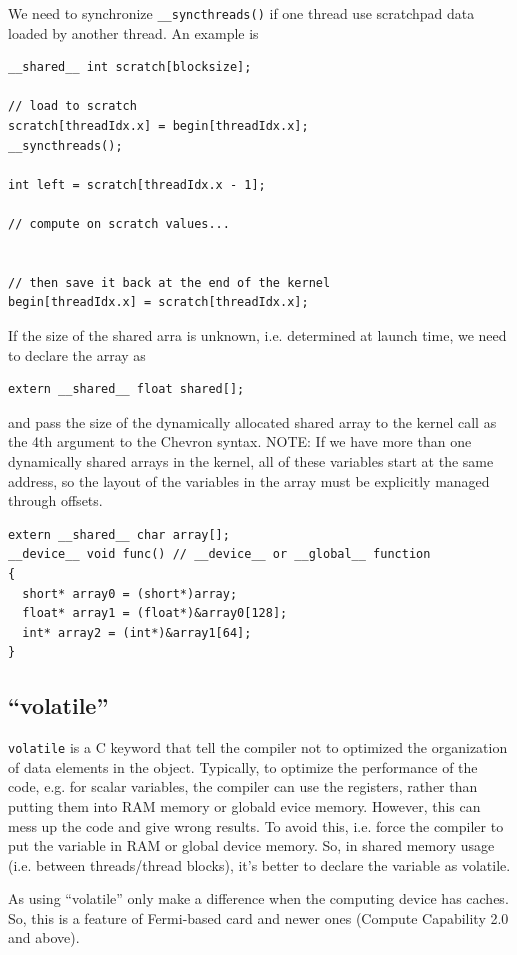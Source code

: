 We need to synchronize \verb!__syncthreads()! if one thread use scratchpad data
loaded by another thread. An example is
\begin{lstlisting}
__shared__ int scratch[blocksize];

// load to scratch
scratch[threadIdx.x] = begin[threadIdx.x];
__syncthreads();

int left = scratch[threadIdx.x - 1];

// compute on scratch values...


// then save it back at the end of the kernel
begin[threadIdx.x] = scratch[threadIdx.x];
\end{lstlisting}

If the size of the shared arra is unknown, i.e. determined at launch time, we
need to declare the array as
\begin{lstlisting}
extern __shared__ float shared[];
\end{lstlisting}
and pass the size of the dynamically allocated shared array to the kernel call
as the 4th argument to the Chevron syntax. NOTE: If we have more than one
dynamically shared arrays in the kernel, all of these variables start at the
same address, so the layout of the variables in the array must be explicitly
managed through offsets.
\begin{lstlisting}
extern __shared__ char array[];
__device__ void func() // __device__ or __global__ function
{
  short* array0 = (short*)array;
  float* array1 = (float*)&array0[128];
  int* array2 = (int*)&array1[64];
}
\end{lstlisting}


\subsection{``volatile''}
\label{sec:volatile}

\verb!volatile! is a C keyword that tell the compiler not to optimized the
organization of data elements in the object. Typically, to optimize the
performance of the code, e.g. for scalar variables, the compiler can use the
registers, rather than putting them into RAM memory or globald evice memory. 
However, this can mess up the code and give wrong results. To avoid this, i.e.
force the compiler to put the variable in RAM or global device memory. So, in
shared memory usage (i.e. between threads/thread blocks), it's better to declare
the variable as volatile. 

As using ``volatile'' only make a difference when the computing device has
caches. So, this is a feature of Fermi-based card and newer ones (Compute
Capability 2.0 and above).

